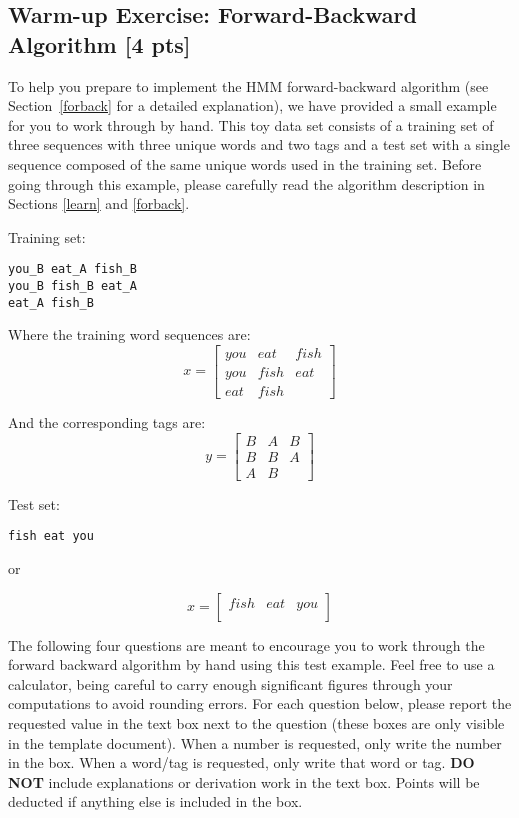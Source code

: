 \documentclass{article}
\begin{document}
\subsection{Warm-up Exercise: Forward-Backward Algorithm [4 pts]}\label{toy}
To help you prepare to implement the HMM forward-backward algorithm (see Section~\ref{forback} for a detailed explanation), we have provided a small example for you to work through by hand. This toy data set consists of a training set of three sequences with three unique words and two tags and a test set with a single sequence composed of the same unique words used in the training set. Before going through this example, please carefully read the algorithm description in Sections \ref{learn} and \ref{forback}.

Training set:
\begin{verbatim}
you_B eat_A fish_B
you_B fish_B eat_A
eat_A fish_B
\end{verbatim}

Where the training word sequences are:
$$
x= 
\begin{bmatrix}
you & eat & fish\\
you & fish & eat\\
eat & fish &
\end{bmatrix}
$$

And the corresponding tags are:
$$
y= 
\begin{bmatrix}
B & A & B\\
B & B & A\\
A & B &
\end{bmatrix}
$$


Test set:
\begin{verbatim}
fish eat you
\end{verbatim}

or 

$$
x= 
\begin{bmatrix}
fish & eat & you\\
\end{bmatrix}
$$

The following four questions are meant to encourage you to work through the forward backward algorithm by hand using this test example. Feel free to use a calculator, being careful to carry enough significant figures through your computations to avoid rounding errors. For each question below, please report the requested value in the text box next to the question (these boxes are only visible in the template document). When a number is requested, only write the number in the box. When a word/tag is requested, only write that word or tag. \textbf{DO NOT} include explanations or derivation work in the text box. Points will be deducted if anything else is included in the box.
\end{document}
